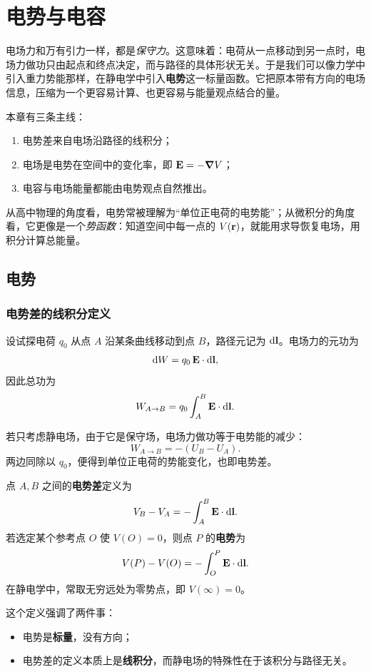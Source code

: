 \chapter{电势与电容}

电场力和万有引力一样，都是\emph{保守力}。这意味着：电荷从一点移动到另一点时，电场力做功只由起点和终点决定，而与路径的具体形状无关。于是我们可以像力学中引入重力势能那样，在静电学中引入\textbf{电势}这一标量函数。它把原本带有方向的电场信息，压缩为一个更容易计算、也更容易与能量观点结合的量。

本章有三条主线：
\begin{enumerate}
  \item 电势差来自电场沿路径的线积分；
  \item 电场是电势在空间中的变化率，即 $\vb E=-\grad V$；
  \item 电容与电场能量都能由电势观点自然推出。
\end{enumerate}

从高中物理的角度看，电势常被理解为“单位正电荷的电势能”；从微积分的角度看，它更像是一个\emph{势函数}：知道空间中每一点的 $V(\vb r)$，就能用求导恢复电场，用积分计算总能量。

\section{电势}

\subsection{电势差的线积分定义}

设试探电荷 $q_0$ 从点 $A$ 沿某条曲线移动到点 $B$，路径元记为 $\dd\vb l$。电场力的元功为
\[
\dd W = q_0\,\vb E\cdot \dd\vb l,
\]
因此总功为
\[
W_{A\to B}=q_0\int_A^B \vb E\cdot \dd\vb l.
\]

若只考虑静电场，由于它是保守场，电场力做功等于电势能的减少：
\[
W_{A\to B}=-(U_B-U_A).
\]
两边同除以 $q_0$，便得到单位正电荷的势能变化，也即电势差。

\begin{definition}
点 $A,B$ 之间的\textbf{电势差}定义为
\[
V_B-V_A=-\int_A^B \vb E\cdot \dd\vb l.
\]
若选定某个参考点 $O$ 使 $V(O)=0$，则点 $P$ 的\textbf{电势}为
\[
V(P)-V(O)=-\int_O^P \vb E\cdot \dd\vb l.
\]
在静电学中，常取无穷远处为零势点，即 $V(\infty)=0$。
\end{definition}

这个定义强调了两件事：
\begin{itemize}
  \item 电势是\textbf{标量}，没有方向；
  \item 电势差的定义本质上是\textbf{线积分}，而静电场的特殊性在于该积分与路径无关。
\end{itemize}

